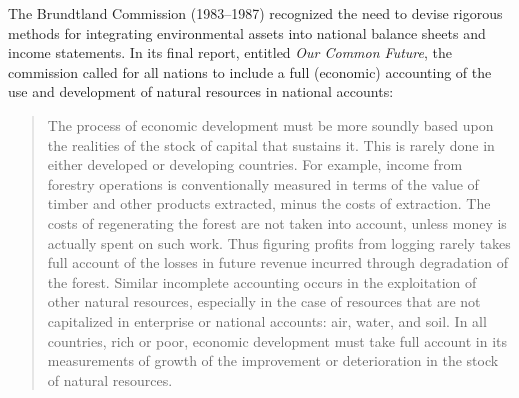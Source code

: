 % 
% 
% 
% 
% 
% 

The Brundtland Commission (1983--1987) recognized the need 
to devise rigorous methods for integrating environmental assets 
into national balance sheets and income statements. 
In its final report, 
entitled \emph{Our Common Future}, 
the commission called for all nations to
include a full (economic) accounting
of the use and development of natural resources 
in national accounts:

\begin{quote}
	The process of economic development must be more soundly 
	based upon the realities of the stock of capital that sustains it. 
	This is rarely done in either developed or developing countries. 
	For example, income from forestry operations is conventionally measured 
	in terms of the value of timber and other products extracted, 
	minus the costs of extraction. 
	The costs of regenerating the forest are not taken into account, 
	unless money is actually spent on such work. 
	Thus figuring profits from logging rarely takes full account 
	of the losses in future revenue incurred through degradation of the forest. 
	Similar incomplete accounting occurs in the exploitation 
	of other natural resources, 
	especially in the case of resources that are not capitalized 
	in enterprise or national accounts: air, water, and soil. 
	In all countries, rich or poor, 
	economic development must take full account 
	in its measurements of growth of the improvement or 
	deterioration in the stock 
	of natural resources.\cite[Chapter~2, Paragraph~36]{brundtland1987}
\end{quote}

